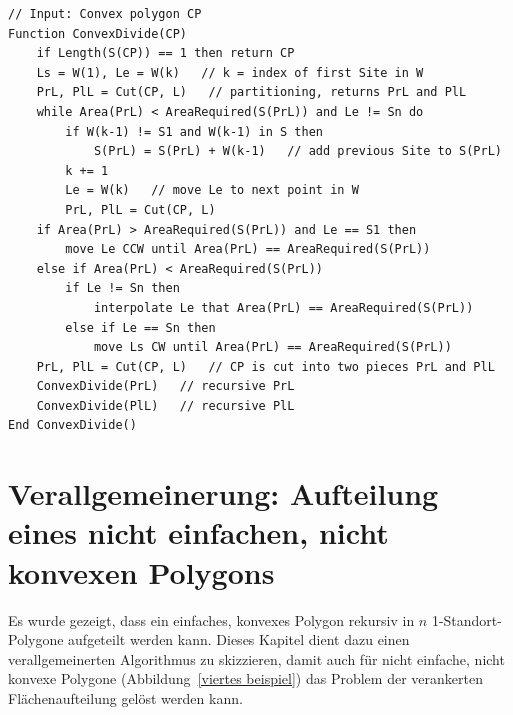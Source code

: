 \documentclass[ngerman]{seminarbeitrag}
\begin{document}
\begin{lstlisting}[float,caption={Der vollständige Algorithmus \mbox{\textit{ConvexDivide}}}, frame=single, label=code konvex]
// Input: Convex polygon CP
Function ConvexDivide(CP)
    if Length(S(CP)) == 1 then return CP 
    Ls = W(1), Le = W(k)   // k = index of first Site in W
    PrL, PlL = Cut(CP, L)   // partitioning, returns PrL and PlL
    while Area(PrL) < AreaRequired(S(PrL)) and Le != Sn do
        if W(k-1) != S1 and W(k-1) in S then 
            S(PrL) = S(PrL) + W(k-1)   // add previous Site to S(PrL)
        k += 1
        Le = W(k)   // move Le to next point in W
        PrL, PlL = Cut(CP, L)
    if Area(PrL) > AreaRequired(S(PrL)) and Le == S1 then
        move Le CCW until Area(PrL) == AreaRequired(S(PrL))
    else if Area(PrL) < AreaRequired(S(PrL)) 
        if Le != Sn then
            interpolate Le that Area(PrL) == AreaRequired(S(PrL))
        else if Le == Sn then 
            move Ls CW until Area(PrL) == AreaRequired(S(PrL))
    PrL, PlL = Cut(CP, L)   // CP is cut into two pieces PrL and PlL
    ConvexDivide(PrL)   // recursive PrL
    ConvexDivide(PlL)   // recursive PlL
End ConvexDivide()
\end{lstlisting}



\section{Verallgemeinerung: Aufteilung eines nicht einfachen, nicht konvexen Polygons}\label{nicht konvex}
Es wurde gezeigt, dass ein einfaches, konvexes Polygon rekursiv in $n$ 1-Standort-Polygone aufgeteilt werden kann. Dieses Kapitel dient dazu einen verallgemeinerten Algorithmus zu skizzieren, damit auch für nicht einfache, nicht konvexe Polygone (Abbildung~\ref{viertes beispiel}) das Problem der verankerten Flächenaufteilung gelöst werden kann.
\end{document}
